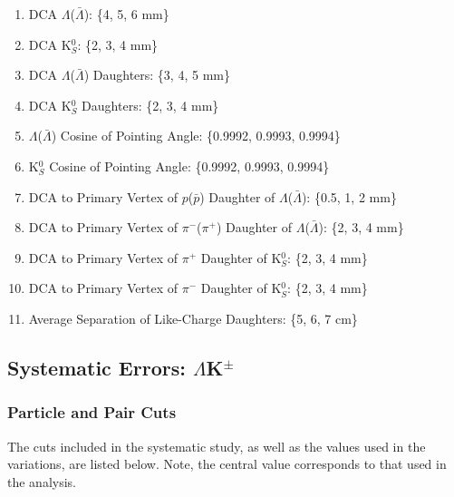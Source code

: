 \documentclass[ALICE,manyauthors]{cernphprep}
\begin{document}
\begin{enumerate}
 \item DCA $\Lambda$($\bar{\Lambda}$): \{4, 5, 6 mm\}
 \item DCA K$^{0}_{S}$: \{2, 3, 4 mm\}
 \item DCA $\Lambda$($\bar{\Lambda}$) Daughters: \{3, 4, 5 mm\}
 \item DCA K$^{0}_{S}$ Daughters: \{2, 3, 4 mm\} 
 \item $\Lambda$($\bar{\Lambda}$) Cosine of Pointing Angle: \{0.9992, 0.9993, 0.9994\}
 \item K$^{0}_{S}$ Cosine of Pointing Angle: \{0.9992, 0.9993, 0.9994\}
 \item DCA to Primary Vertex of $p$($\bar{p}$) Daughter of $\Lambda$($\bar{\Lambda}$):  \{0.5, 1, 2 mm\}
 \item DCA to Primary Vertex of $\pi^{-}$($\pi^{+}$) Daughter of $\Lambda$($\bar{\Lambda}$):  \{2, 3, 4 mm\} 
 \item DCA to Primary Vertex of $\pi^{+}$ Daughter of K$^{0}_{S}$: \{2, 3, 4 mm\}
 \item DCA to Primary Vertex of $\pi^{-}$ Daughter of K$^{0}_{S}$: \{2, 3, 4 mm\}
 \item Average Separation of Like-Charge Daughters: \{5, 6, 7 cm\}
\end{enumerate}





\subsection{Systematic Errors: \texorpdfstring{$\Lambda$K$^{\pm}$}{TEXT}}
\label{SysErrsLamKch}

\subsubsection{Particle and Pair Cuts}
\label{SysErrsLamKch:ParticleAndPairCuts}

The cuts included in the systematic study, as well as the values used in the variations, are listed below.  Note, the central value corresponds to that used in the analysis.
\end{document}
